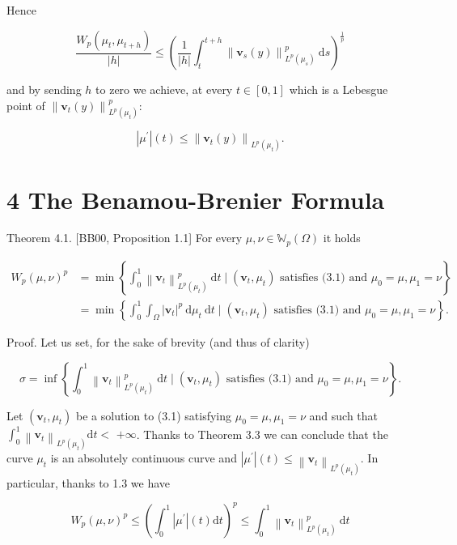 \documentclass[10pt]{article}
\begin{document}
Hence

\[
\frac{W_{p}\left(\mu_{t}, \mu_{t+h}\right)}{|h|} \leq\left(\frac{1}{|h|} \int_{t}^{t+h}\left\|\mathbf{v}_{s}(y)\right\|_{L^{p}\left(\mu_{s}\right)}^{p} \mathrm{~d} s\right)^{\frac{1}{p}}
\]

and by sending \(h\) to zero we achieve, at every \(t \in[0,1]\) which is a Lebesgue point of \(\left\|\mathbf{v}_{t}(y)\right\|_{L^{p}\left(\mu_{t}\right)}^{p}:\)

\[
\left|\mu^{\prime}\right|(t) \leq\left\|\mathbf{v}_{t}(y)\right\|_{L^{p}\left(\mu_{t}\right)} .
\]

\section*{4 The Benamou-Brenier Formula}
Theorem 4.1. [BB00, Proposition 1.1] For every \(\mu, \nu \in \mathbb{W}_{p}(\Omega)\) it holds

\[
\begin{aligned}
W_{p}(\mu, \nu)^{p} & =\min \left\{\int_{0}^{1}\left\|\mathbf{v}_{t}\right\|_{L^{p}\left(\mu_{t}\right)}^{p} \mathrm{~d} t \mid\left(\mathbf{v}_{t}, \mu_{t}\right) \text { satisfies (3.1) and } \mu_{0}=\mu, \mu_{1}=\nu\right\} \\
& =\min \left\{\int_{0}^{1} \int_{\Omega}\left|\mathbf{v}_{t}\right|^{p} \mathrm{~d} \mu_{t} \mathrm{~d} t \mid\left(\mathbf{v}_{t}, \mu_{t}\right) \text { satisfies (3.1) and } \mu_{0}=\mu, \mu_{1}=\nu\right\} .
\end{aligned}
\]

Proof. Let us set, for the sake of brevity (and thus of clarity)

\[
\sigma=\inf \left\{\int_{0}^{1}\left\|\mathbf{v}_{t}\right\|_{L^{p}\left(\mu_{t}\right)}^{p} \mathrm{~d} t \mid\left(\mathbf{v}_{t}, \mu_{t}\right) \text { satisfies (3.1) and } \mu_{0}=\mu, \mu_{1}=\nu\right\} .
\]

Let \(\left(\mathbf{v}_{t}, \mu_{t}\right)\) be a solution to (3.1) satisfying \(\mu_{0}=\mu, \mu_{1}=\nu\) and such that \(\int_{0}^{1}\left\|\mathbf{v}_{t}\right\|_{L^{p}\left(\mu_{t}\right)} \mathrm{d} t<\) \(+\infty\). Thanks to Theorem 3.3 we can conclude that the curve \(\mu_{t}\) is an absolutely continuous curve and \(\left|\mu^{\prime}\right|(t) \leq\left\|\mathbf{v}_{t}\right\|_{L^{p}\left(\mu_{t}\right)}\). In particular, thanks to 1.3 we have

\[
W_{p}(\mu, \nu)^{p} \leq\left(\int_{0}^{1}\left|\mu^{\prime}\right|(t) \mathrm{d} t\right)^{p} \leq \int_{0}^{1}\left\|\mathbf{v}_{t}\right\|_{L^{p}\left(\mu_{t}\right)}^{p} \mathrm{~d} t
\]
\end{document}

